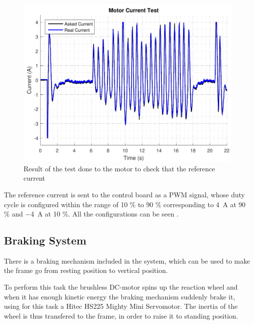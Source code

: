 \begin{figure}[H]
	\includegraphics[scale=.65]{figures/motorCurrentTest}
	\centering
	\caption{Result of the test done to the motor to check that the reference current }
\end{figure} \label{motorCurrentTest2}

The reference current is sent to the control board as a PWM signal, whose duty cycle is configured within the range of 10 \% to 90 \% corresponding to \SI{4}{A} at 90 \% and \SI{-4}{A} at 10 \%. All the configurations can be seen .


\subsection{Braking System}
There is a braking mechanism included in the system, which can be used to make the frame go from resting position to vertical position.

To perform this task the brushless DC-motor spins up the reaction wheel and when it has enough kinetic energy the braking mechanism suddenly brake it, using for this task a Hitec HS225 Mighty Mini Servomotor. The inertia of the wheel is thus transfered to the frame, in order to raise it to standing position.


